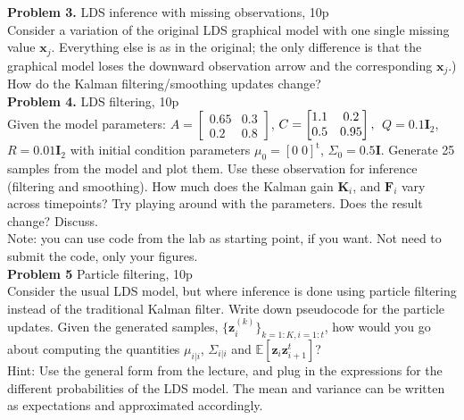 \documentclass[12pt]{article}
\newcommand{\vect}[1]{\mathbf{#1}}
\begin{document}
\noindent \textbf{Problem 3.} LDS inference with missing observations, 10p \\%
Consider a variation of the original LDS graphical model with one single missing value $\mathbf{x}_j$. Everything else is as in the original; the only difference is that the graphical model loses the downward observation arrow and the corresponding $\mathbf{x}_j$.)
How do the Kalman filtering/smoothing updates change?\\

\noindent \textbf{Problem 4.}  LDS filtering, 10p\\ 
Given the model parameters: $A = 
\begin{bmatrix} %
0.65 &   0.3\\
    0.2   & 0.8
\end{bmatrix}
$,
$C= 
\begin{bmatrix}  
    1.1 & 0.2\\
    0.5 & 0.95\\
\end{bmatrix},\\
$
$Q= 0.1 \vect{I}_2$, 
$R= 0.01 \vect{I}_2$ with initial condition parameters $\mu_0 = [0\; 0]^\mathrm{t}$, $\Sigma_0 = 0.5 \vect{I}$.
Generate 25 samples from the model and  plot them. Use these observation for inference (filtering and smoothing). How much does the Kalman gain $\mathbf{K}_i$, and $\mathbf{F}_i$ vary across timepoints? Try playing around with the parameters. Does the result change? Discuss.\\
Note: you can use code from the lab as starting point, if you want. Not need to submit the code, only your figures.
\\

\noindent \textbf{Problem 5 }  Particle filtering, 10p\\%
Consider the usual LDS model, but where inference is done using particle filtering instead of the traditional Kalman filter. Write down pseudocode for the particle updates. Given the generated samples, $\{\mathbf{z}_i^{(k)}\}_{k=1:K, i=1:t}$, how would you go about computing the quantities $\mu_{i|i}$, $\Sigma_{i|i}$ and $\mathbb{E}[\mathbf{z}_i \mathbf{z}_{i+1}^t]$?\\
Hint: Use the general form from the lecture, and plug in the expressions for the different probabilities of the LDS model. The mean and variance can be written as expectations and approximated accordingly.
\end{document}
